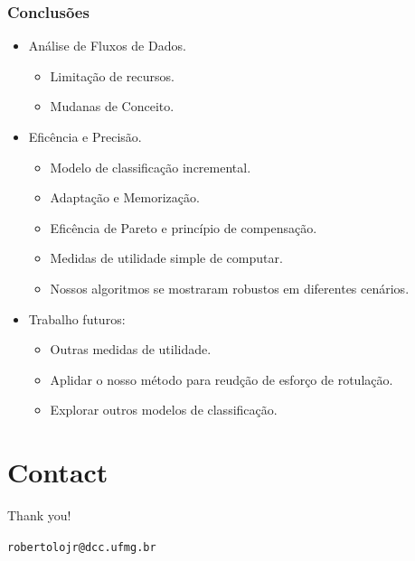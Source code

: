 \documentclass[14pt]{beamer}
\begin{document}
\begin{frame}\frametitle{Conclusões}
\begin{itemize}
\item Análise de Fluxos de Dados.
\begin{itemize}
\item Limitação de recursos.
\item Mudanas de Conceito.
\end{itemize}
\pause
\item Eficência e Precisão.
\begin{itemize}
\item Modelo de classificação incremental.
\item Adaptação e Memorização.
\item Eficência de Pareto e princípio de compensação.
\item Medidas de utilidade simple de computar.
\item Nossos algoritmos se mostraram robustos em diferentes cenários.
\end{itemize}
\pause
\item Trabalho futuros:
\begin{itemize}
\item Outras medidas de utilidade.
\item Aplidar o nosso método para reudção de esforço de rotulação.
\item Explorar outros modelos de classificação.
\end{itemize}
\end{itemize}

\end{frame}

\section{Contact}
\begin{frame}{Thank you!}
\begin{center}
\tt robertolojr@dcc.ufmg.br\\
\end{center}
\end{frame}
\end{document}
